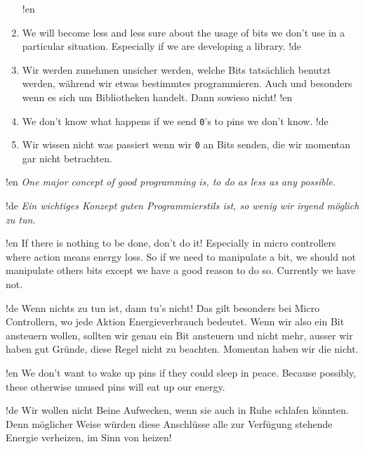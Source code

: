 \begin{enumerate}
!en   \item We will become less and less sure about the usage of bits we don't use in a particular situation. Especially if we are developing a library.
!de   \item Wir werden zunehmen unsicher werden, welche Bits tatsächlich benutzt werden, während wir etwas bestimmtes programmieren. Auch und besonders wenn es sich um Bibliotheken handelt. Dann sowieso nicht!
!en   \item We don't know what happens if we send \texttt{0}'s to pins we don't know.
!de   \item Wir wissen nicht was passiert wenn wir \texttt{0} an Bits senden, die wir momentan gar nicht betrachten.
\end{enumerate}



!en \emph{One major concept of good programming is, to do as less as any possible.}

!de \emph{Ein wichtiges Konzept guten Programmierstils ist, so wenig wir irgend möglich zu tun.}



!en If there is nothing to be done, don't do it! Especially in micro controllers where action means energy loss. So if we need to manipulate a bit, we should not manipulate others bits except we have a good reason to do so. Currently we have not.

!de Wenn nichts zu tun ist, dann tu's nicht! Das gilt besonders bei Micro Controllern, wo jede Aktion Energieverbrauch bedeutet. Wenn wir also ein Bit ansteuern wollen, sollten wir genau ein Bit ansteuern und nicht mehr, ausser wir haben gut Gründe, diese Regel nicht zu beachten. Momentan haben wir die nicht.



!en We don't want to wake up pins if they could sleep in peace. Because possibly, these otherwise unused pins will eat up our energy.

!de Wir wollen nicht Beine Aufwecken, wenn sie auch in Ruhe schlafen könnten. Denn möglicher Weise würden diese Anschlüsse alle zur Verfügung stehende Energie verheizen, im Sinn von heizen!
